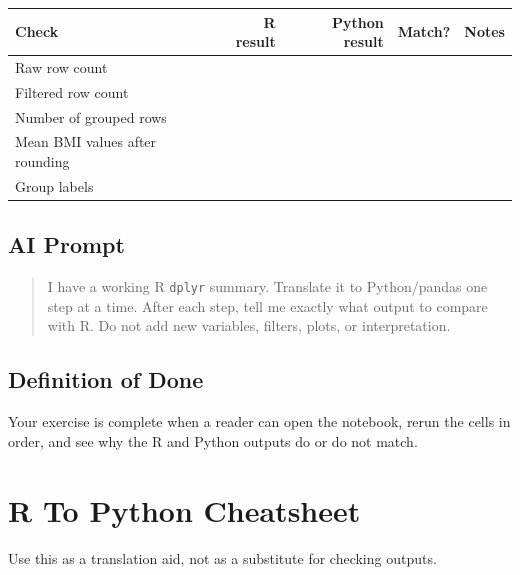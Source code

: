 \documentclass[
  letterpaper,
  DIV=11,
  numbers=noendperiod,
  oneside]{scrreprt}
\begin{document}
\begin{longtable}[]{@{}lrrcl@{}}
\toprule\noalign{}
Check & R result & Python result & Match? & Notes \\
\midrule\noalign{}
\endhead
\bottomrule\noalign{}
\endlastfoot
Raw row count & & & & \\
Filtered row count & & & & \\
Number of grouped rows & & & & \\
Mean BMI values after rounding & & & & \\
Group labels & & & & \\
\end{longtable}

\section{AI Prompt}\label{ai-prompt}

\begin{quote}
I have a working R \texttt{dplyr} summary. Translate it to Python/pandas
one step at a time. After each step, tell me exactly what output to
compare with R. Do not add new variables, filters, plots, or
interpretation.
\end{quote}

\section{Definition of Done}\label{definition-of-done-1}

Your exercise is complete when a reader can open the notebook, rerun the
cells in order, and see why the R and Python outputs do or do not match.

\chapter{R To Python Cheatsheet}\label{r-to-python-cheatsheet}

Use this as a translation aid, not as a substitute for checking outputs.
\end{document}
